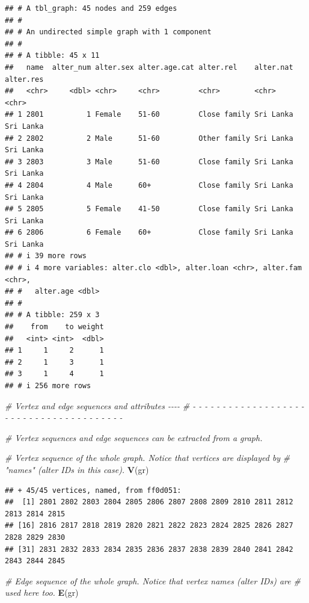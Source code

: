 \documentclass[
]{book}
\newenvironment{Shaded}{\begin{snugshade}}{\end{snugshade}}
\newcommand{\CommentTok}[1]{\textcolor[rgb]{0.56,0.35,0.01}{\textit{#1}}}
\newcommand{\FunctionTok}[1]{\textcolor[rgb]{0.13,0.29,0.53}{\textbf{#1}}}
\newcommand{\NormalTok}[1]{#1}
\begin{document}
\begin{verbatim}
## # A tbl_graph: 45 nodes and 259 edges
## #
## # An undirected simple graph with 1 component
## #
## # A tibble: 45 x 11
##   name  alter_num alter.sex alter.age.cat alter.rel    alter.nat alter.res
##   <chr>     <dbl> <chr>     <chr>         <chr>        <chr>     <chr>    
## 1 2801          1 Female    51-60         Close family Sri Lanka Sri Lanka
## 2 2802          2 Male      51-60         Other family Sri Lanka Sri Lanka
## 3 2803          3 Male      51-60         Close family Sri Lanka Sri Lanka
## 4 2804          4 Male      60+           Close family Sri Lanka Sri Lanka
## 5 2805          5 Female    41-50         Close family Sri Lanka Sri Lanka
## 6 2806          6 Female    60+           Close family Sri Lanka Sri Lanka
## # i 39 more rows
## # i 4 more variables: alter.clo <dbl>, alter.loan <chr>, alter.fam <chr>,
## #   alter.age <dbl>
## #
## # A tibble: 259 x 3
##    from    to weight
##   <int> <int>  <dbl>
## 1     1     2      1
## 2     1     3      1
## 3     1     4      1
## # i 256 more rows
\end{verbatim}

\begin{Shaded}
\begin{Highlighting}[]
\CommentTok{\# Vertex and edge sequences and attributes                                  {-}{-}{-}{-}}
\CommentTok{\# {-} {-} {-} {-} {-} {-} {-} {-} {-} {-} {-} {-} {-} {-} {-} {-} {-} {-} {-} {-} {-} {-} {-} {-} {-} {-} {-} {-} {-} {-} {-} {-} {-} {-} {-} {-} {-} {-} {-} }

\CommentTok{\# Vertex sequences and edge sequences can be extracted from a graph.}

\CommentTok{\# Vertex sequence of the whole graph. Notice that vertices are displayed by}
\CommentTok{\# "names" (alter IDs in this case).}
\FunctionTok{V}\NormalTok{(gr)}
\end{Highlighting}
\end{Shaded}

\begin{verbatim}
## + 45/45 vertices, named, from ff0d051:
##  [1] 2801 2802 2803 2804 2805 2806 2807 2808 2809 2810 2811 2812 2813 2814 2815
## [16] 2816 2817 2818 2819 2820 2821 2822 2823 2824 2825 2826 2827 2828 2829 2830
## [31] 2831 2832 2833 2834 2835 2836 2837 2838 2839 2840 2841 2842 2843 2844 2845
\end{verbatim}

\begin{Shaded}
\begin{Highlighting}[]
\CommentTok{\# Edge sequence of the whole graph. Notice that vertex names (alter IDs) are}
\CommentTok{\# used here too.}
\FunctionTok{E}\NormalTok{(gr)}
\end{Highlighting}
\end{Shaded}
\end{document}
